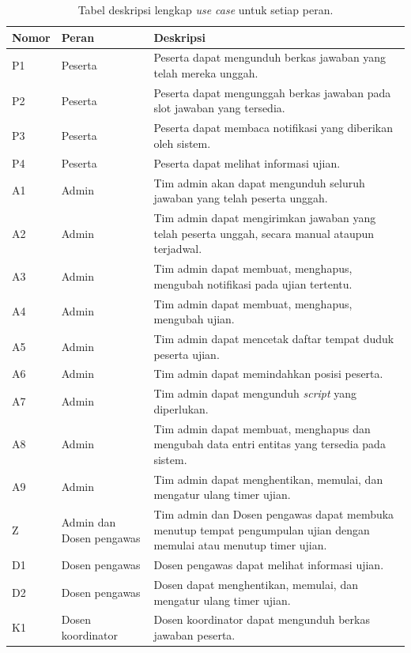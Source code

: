 \begin{table}[ht]
    \centering
    \caption{Tabel deskripsi lengkap \textit{use case} untuk setiap peran.}
    \label{tab:usecase_desc}
    \begin{tabularx}{\textwidth}{|p{1.2cm}|p{2cm}|X|}
         \hline
         Nomor & Peran & Deskripsi  \\
         \hline
         P1 & Peserta & Peserta dapat mengunduh berkas jawaban yang telah mereka unggah. \\
         \hline
         P2 & Peserta & Peserta dapat mengunggah berkas jawaban pada slot jawaban yang tersedia. \\
         \hline
         P3 & Peserta & Peserta dapat membaca notifikasi yang diberikan oleh sistem. \\
         \hline
         P4 & Peserta & Peserta dapat melihat informasi ujian. \\
         \hline
         A1 & Admin & Tim admin akan dapat mengunduh seluruh jawaban yang telah peserta unggah. \\
         \hline
         A2 & Admin & Tim admin dapat mengirimkan jawaban yang telah peserta unggah, secara manual ataupun terjadwal. \\
         \hline
         A3 & Admin & Tim admin dapat membuat, menghapus, mengubah notifikasi pada ujian tertentu. \\
         \hline
         A4 & Admin & Tim admin dapat membuat, menghapus, mengubah ujian. \\
         \hline
         A5 & Admin & Tim admin dapat mencetak daftar tempat duduk peserta ujian. \\
         \hline
         A6 & Admin & Tim admin dapat memindahkan posisi peserta. \\
         \hline
         A7 & Admin & Tim admin dapat mengunduh \textit{script} yang diperlukan. \\
         \hline
         A8 & Admin & Tim admin dapat membuat, menghapus dan mengubah data entri entitas yang tersedia pada sistem. \\
         \hline
         A9 & Admin & Tim admin dapat menghentikan, memulai, dan mengatur ulang timer ujian. \\
         \hline
         Z & Admin dan Dosen pengawas & Tim admin dan Dosen pengawas dapat membuka menutup tempat pengumpulan ujian dengan
         memulai atau menutup timer ujian. \\
         \hline
         D1 & Dosen pengawas & Dosen pengawas dapat melihat informasi ujian. \\
         \hline
         D2 & Dosen pengawas & Dosen dapat menghentikan, memulai, dan mengatur ulang timer ujian. \\
         \hline
         K1 & Dosen koordinator & Dosen koordinator dapat mengunduh berkas jawaban peserta. \\
         \hline
    \end{tabularx}
\end{table}
